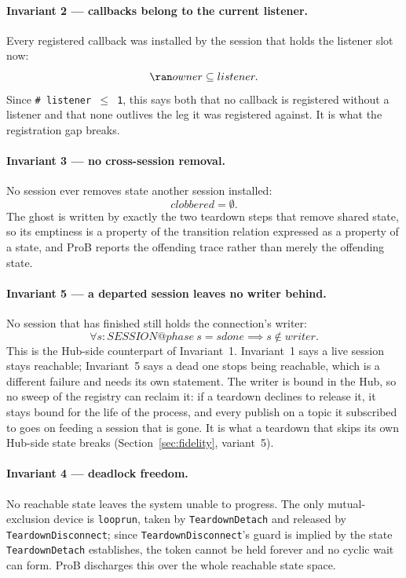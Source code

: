 \documentclass[a4paper,10pt,fleqn]{article}
\begin{document}
\paragraph{Invariant 2 --- callbacks belong to the current listener.}
Every registered callback was installed by the session that holds the
listener slot now:
\[
  \ran owner \subseteq listener.
\]
Since \texttt{\# listener $\leq$ 1}, this says both that no callback is
registered without a listener and that none outlives the leg it was
registered against.  It is what the registration gap breaks.

\paragraph{Invariant 3 --- no cross-session removal.}
No session ever removes state another session installed:
\[
  clobbered = \emptyset.
\]
The ghost is written by exactly the two teardown steps that remove
shared state, so its emptiness is a property of the transition relation
expressed as a property of a state, and ProB reports the offending trace
rather than merely the offending state.

\paragraph{Invariant 5 --- a departed session leaves no writer behind.}
No session that has finished still holds the connection's writer:
\[
  \forall s : SESSION @ phase~s = sdone \implies s \notin writer.
\]
This is the Hub-side counterpart of Invariant~1.  Invariant~1 says a
live session stays reachable; Invariant~5 says a dead one stops being
reachable, which is a different failure and needs its own statement.
The writer is bound in the Hub, so no sweep of the registry can reclaim
it: if a teardown declines to release it, it stays bound for the life of
the process, and every publish on a topic it subscribed to goes on
feeding a session that is gone.  It is what a teardown that skips its
own Hub-side state breaks (Section~\ref{sec:fidelity}, variant~5).

\paragraph{Invariant 4 --- deadlock freedom.}
No reachable state leaves the system unable to progress.  The only
mutual-exclusion device is \texttt{looprun}, taken by
\texttt{TeardownDetach} and released by \texttt{TeardownDisconnect};
since \texttt{TeardownDisconnect}'s guard is implied by the state
\texttt{TeardownDetach} establishes, the token cannot be held forever
and no cyclic wait can form.  ProB discharges this over the whole
reachable state space.
\end{document}
